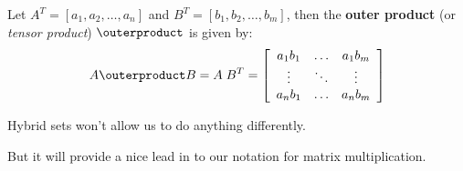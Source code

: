 \begin{definition}
	Let $A^T = [ a_1, a_2, \ldots, a_n]$ and $B^T = [ b_1, b_2, \ldots, b_m]$,
	then the \textbf{outer product} (or \emph{tensor product}) $\outerproduct$ is given by:
	\begin{equation}
		A \outerproduct B = A \; B^T = \left[
			\begin{array}{ccc}
				a_1 b_1 & \ldots 	& a_1 b_m \\
				\vdots 	& \ddots & \vdots \\
				a_n b_1 & \ldots 	& a_n b_m
			\end{array}
		\right]
	\end{equation}
\end{definition}

Hybrid sets won't allow us to do anything differently.

But it will provide a nice lead in to our notation for matrix multiplication.